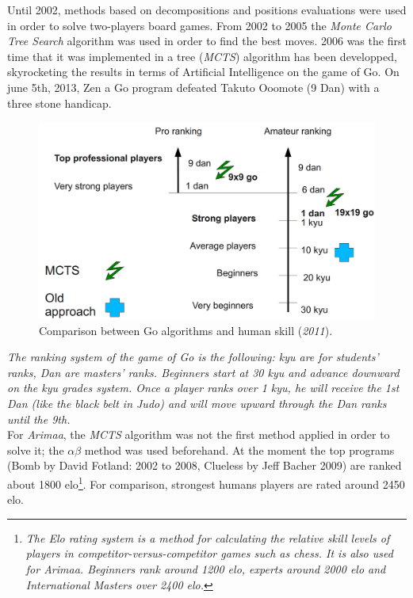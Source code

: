 \label{third part part}
Until 2002, methods based on decompositions and positions evaluations were used in order to solve two-players board games. From 2002 to 2005 the \emph{Monte Carlo Tree Search} algorithm was used in order to find the best moves. 2006 was the first time that it was implemented in a tree (\emph{MCTS}) algorithm has been developped, skyrocketing the results in terms of Artificial Intelligence on the game of Go. On june 5th, 2013, Zen a Go program defeated Takuto Ooomote (9 Dan) with a three stone handicap.\cite{computer_Go_vs_human}
\begin{figure}[H]
\centering
\includegraphics[width=12cm]{2_State_of_the_art/Arimaa_on_MCTS_Benoit/img/ranking.png}
\caption{\label{fig:ranking}Comparison between Go algorithms and human skill (\textit{2011})\cite{graphic_MCTS_Go}.}
\end{figure}
\textit{The ranking system of the game of Go is the following: kyu are for students' ranks, Dan are masters' ranks. Beginners start at 30 kyu and advance downward on the kyu grades system. Once a player ranks over 1 kyu, he will receive the 1st Dan (like the black belt in Judo) and will move upward through the Dan ranks until the 9th.}\bigskip
\\

For \emph{Arimaa}, the \emph{MCTS} algorithm was not the first method applied in order to solve it; the \ensuremath{\alpha\beta} method was used beforehand. At the moment the top programs (Bomb by David Fotland: 2002 to 2008, Clueless by Jeff Bacher 2009) are ranked about 1800 elo\footnote{\textit{The Elo rating system is a method for calculating the relative skill levels of players in competitor-versus-competitor games such as chess. It is also used for Arimaa. Beginners rank around 1200 elo, experts around 2000 elo and International Masters over 2400 elo.}}. For comparison, strongest humans players are rated around 2450 elo.\cite{master_mcts_kozeleck}
\medskip
